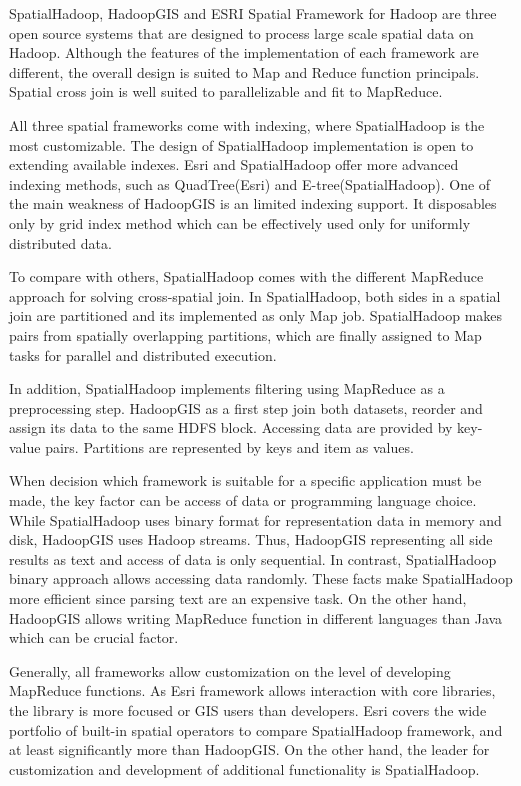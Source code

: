 \documentclass[a4paper,12pt,oneside]{report}
\begin{document}
	SpatialHadoop, HadoopGIS and ESRI Spatial Framework for Hadoop are
	three open source systems that are designed to process large scale
	spatial data on Hadoop. Although the features of  the implementation of each
	framework are different, 
	the overall design is suited to Map and Reduce function principals. Spatial
	cross join is well suited to parallelizable and fit to MapReduce. 
	
	All three spatial frameworks come with indexing, where SpatialHadoop is the most
	customizable. 
	The design of  SpatialHadoop implementation is open to extending available
	indexes. Esri and 
	SpatialHadoop offer more advanced indexing methods, such as 
	QuadTree(Esri) and E-tree(SpatialHadoop). One of the main weakness of HadoopGIS
	is an limited indexing 
	support. It disposables only by grid index method which can be 
	effectively used only for uniformly distributed data.
	
	To compare with others, SpatialHadoop comes with the different MapReduce
	approach for solving cross-spatial join.
	In SpatialHadoop, both sides in a spatial join are partitioned and its
	implemented as only 
	Map job.  SpatialHadoop makes pairs from spatially overlapping partitions, which
	are finally 
	assigned to Map tasks for parallel and distributed execution.
	
	In addition, SpatialHadoop implements filtering using MapReduce as a
	preprocessing step.
	HadoopGIS as a first step join both datasets, reorder and assign its data to the
	same 
	HDFS block.  Accessing data are provided by key-value pairs. Partitions are
	represented by keys and item as values. 
	
	When decision which framework is suitable for a specific application must be
	made, the 
	key factor can be access of data  or programming language choice. While
	SpatialHadoop 
	uses binary format for representation data in memory and disk, HadoopGIS 
	uses Hadoop streams. Thus, HadoopGIS representing all side results as text and
	access 
	of data is only sequential. In contrast, SpatialHadoop binary approach allows 
	accessing data randomly.
	These facts make SpatialHadoop more efficient since parsing text are an
	expensive task. 
	On the other hand, HadoopGIS allows writing MapReduce function in different
	languages than Java which can be crucial factor. 
	
	
	Generally, all frameworks allow customization on the level of developing
	MapReduce functions. As Esri 
	framework allows interaction with core libraries, the library is more focused or
	GIS users than developers. 
	Esri covers the wide portfolio of built-in spatial operators to compare
	SpatialHadoop framework, 
	and at least significantly more than HadoopGIS. On the other hand, the leader
	for customization and 
	development of additional functionality is SpatialHadoop.
	
\end{document}
